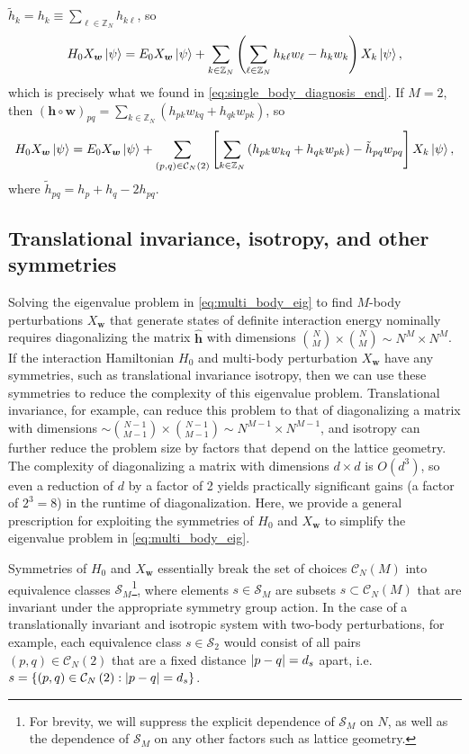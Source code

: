 \documentclass[nofootinbib,notitlepage,11pt]{revtex4-2}
\newcommand{\p}[1]{\left(#1\right)} %
\renewcommand{\sp}[1]{\left[#1\right]} %
\renewcommand{\set}[1]{\left\{#1\right\}} %
\newcommand{\m}{\bm} %
\newcommand{\1}{\mathds{1}}
\newcommand{\C}{\mathcal{C}}
\renewcommand{\S}{\mathcal{S}}
\newcommand{\ZZ}{\mathbb{Z}}
\begin{document}
$\tilde h_k = h_k \equiv \sum_{\ell\in\ZZ_N} h_{k\ell}$, so
\begin{align}
  H_0 X_{\m w} \ket\psi
  = E_0 X_{\m w} \ket\psi + \sum_{k\in\ZZ_N}
  \p{\sum_{\ell\in\ZZ_N} h_{k\ell} w_\ell - h_k w_k} X_k \ket\psi,
\end{align}
which is precisely what we found in
\eqref{eq:single_body_diagnosis_end}.  If $M=2$, then
$\p{\m h\circ\m w}_{pq} = \sum_{k\in\ZZ_N}
\p{h_{pk}w_{kq}+h_{qk}w_{pk}}$, so
\begin{align}
  H_0 X_{\m w} \ket\psi
  = E_0 X_{\m w} \ket\psi + \sum_{\p{p,q}\in\C_N\p{2}}
  \sp{\sum_{k\in\ZZ_N}\p{h_{pk} w_{kq} + h_{qk} w_{pk}}
    - \tilde h_{pq} w_{pq}}
  X_k \ket\psi,
\end{align}
where $\tilde h_{pq}=h_p+h_q-2h_{pq}$.

\subsection{Translational invariance, isotropy, and other symmetries}
\label{sec:symmetries}

Solving the eigenvalue problem in \eqref{eq:multi_body_eig} to find
$M$-body perturbations $X_{\m w}$ that generate states of definite
interaction energy nominally requires diagonalizing the matrix
$\hat{\m h}$ with dimensions
${N\choose M}\times{N\choose M}\sim N^M\times N^M$.  If the
interaction Hamiltonian $H_0$ and multi-body perturbation $X_{\m w}$
have any symmetries, such as translational invariance isotropy, then
we can use these symmetries to reduce the complexity of this
eigenvalue problem.  Translational invariance, for example, can reduce
this problem to that of diagonalizing a matrix with dimensions
$\sim{N-1\choose M-1}\times{N-1\choose M-1}\sim N^{M-1}\times
N^{M-1}$, and isotropy can further reduce the problem size by factors
that depend on the lattice geometry.  The complexity of diagonalizing
a matrix with dimensions $d\times d$ is $O\p{d^3}$, so even a
reduction of $d$ by a factor of 2 yields practically significant gains
(a factor of $2^3=8$) in the runtime of diagonalization.  Here, we
provide a general prescription for exploiting the symmetries of $H_0$
and $X_{\m w}$ to simplify the eigenvalue problem in
\eqref{eq:multi_body_eig}.

Symmetries of $H_0$ and $X_{\m w}$ essentially break the set of
choices $\C_N\p{M}$ into equivalence classes $\S_M$\footnote{For
  brevity, we will suppress the explicit dependence of $\S_M$ on $N$,
  as well as the dependence of $\S_M$ on any other factors such as
  lattice geometry.}, where elements $s\in\S_M$ are subsets
$s\subset\C_N\p{M}$ that are invariant under the appropriate symmetry
group action.  In the case of a translationally invariant and
isotropic system with two-body perturbations, for example, each
equivalence class $s\in\S_2$ would consist of all pairs
$\p{p,q}\in\C_N\p{2}$ that are a fixed distance $\abs{p-q}=d_s$ apart,
i.e.~$s=\set{\p{p,q}\in\C_N\p{2}:\abs{p-q}=d_s}$.
\end{document}
